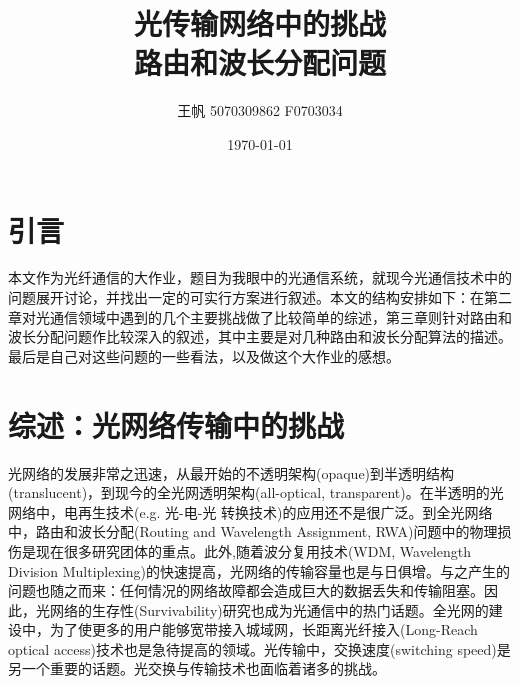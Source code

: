 \documentclass[11pt,twocolumn]{ctexart}
\begin{document}
\title{\textbf{光传输网络中的挑战}\\[1ex]路由和波长分配问题}
\author{王帆 5070309862 F0703034}
\date{\today}

\section{引言}
本文作为光纤通信的大作业，题目为我眼中的光通信系统，就现今光通信技术中的问题展开讨论，并找出一定的可实行方案进行叙述。本文的结构安排如下：在第二章对光通信领域中遇到的几个主要挑战做了比较简单的综述，第三章则针对路由和波长分配问题作比较深入的叙述，其中主要是对几种路由和波长分配算法的描述。\cite{1,6,8,9}最后是自己对这些问题的一些看法，以及做这个大作业的感想。

\section{综述：光网络传输中的挑战}
光网络的发展非常之迅速，从最开始的不透明架构(opaque)到半透明结构(translucent)，到现今的全光网透明架构(all-optical, transparent)。在半透明的光网络中，电再生技术(e.g. 光-电-光 转换技术)的应用还不是很广泛。到全光网络中，路由和波长分配(Routing and Wavelength Assignment, RWA)问题中的物理损伤是现在很多研究团体的重点。\cite{1,6,8,9}此外,随着波分复用技术(WDM, Wavelength Division Multiplexing)的快速提高，光网络的传输容量也是与日俱增。与之产生的问题也随之而来：任何情况的网络故障都会造成巨大的数据丢失和传输阻塞。因此，光网络的生存性(Survivability)研究也成为光通信中的热门话题。\cite{2}全光网的建设中，为了使更多的用户能够宽带接入城域网，长距离光纤接入(Long-Reach optical access)技术也是急待提高的领域。\cite{3,4}光传输中，交换速度(switching speed)是另一个重要的话题。光交换与传输技术也面临着诸多的挑战。\cite{5,7}
\end{document}
